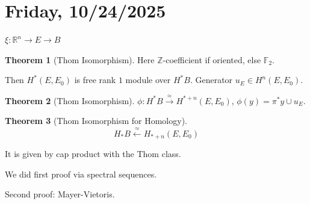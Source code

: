 \documentclass{article}
\theoremstyle{definition}
\newtheorem{theorem}{Theorem}
\begin{document}
    \section*{Friday, 10/24/2025}
    
    \(\xi : \mathbb{R}^n \to E \to B\)

    \begin{theorem}
        [Thom Isomorphism] Here \(\mathbb{Z}\)-coefficient if oriented, else \(\mathbb{F}_2\).

        Then \(H^{\ast} (E,E_0)\) is free rank \(1\) module over \(H^{\ast} B\). Generator \(u_E \in H^n(E,E_0)\).
    \end{theorem}

    \begin{theorem}
        [Thom Isomorphism]

        \(\phi : H^{\ast} B \xrightarrow{\approx} H^{\ast + n} (E,E_0)\), \(\phi (y) = \pi ^{\ast} y \cup u_E\).
    \end{theorem}

    \begin{theorem}
        [Thom Isomorphism for Homology]

        \[
            H_{\ast} B \xleftarrow{\approx} H_{\ast + n} (E,E_0)
        \] 

        It is given by cap product with the Thom class.

    \end{theorem}

    We did first proof via spectral sequences.

    Second proof: Mayer-Vietoris.
\end{document}

